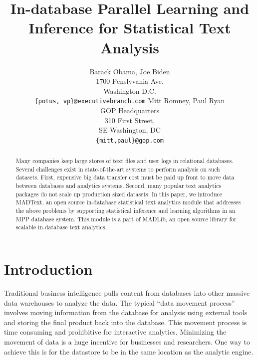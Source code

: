 \documentclass[11pt,letterpaper]{article}
\title{In-database Parallel Learning and Inference for Statistical Text Analysis}
\author{Barack Obama, Joe Biden\\
1700 Penslyvania Ave.\\
Washington D.C.\\
{\tt \{potus, vp\}@executivebranch.com}
\And
Mitt Romney, Paul Ryan\\
GOP Headquarters\\
310 First Street,\\
SE Washington, DC\\
{\tt \{mitt,paul\}@gop.com}
}
\date{}
\begin{document}
\maketitle
\begin{abstract}
Many companies keep large stores of text files and user logs in relational databases.
Several challenges exist in state-of-the-art systems to perform analysis on such datasets.
First, expensive big data transfer cost must be paid up front to move data between databases
 and analytics systems. Second, many popular text analytics packages do not scale up production sized datasets.
In this paper, we introduce MADText, an open source in-database statistical text analytics module that
 addresses the above problems by supporting statistical inference and learning algorithms in an MPP database system.
This module is a part of MADLib, an open source library for scalable in-database text analytics. 

\end{abstract}

\section{Introduction}

Traditional business intelligence pulls content from databases into other massive 
data warehouses to analyze the data. 
The typical ``data movement process'' involves moving information from the database for 
analysis using external tools and storing the final product back into the database.
This movement process is time consuming and prohibitive for interactive analytics.
Minimizing the movement of data is a huge incentive for businesses and researchers.
One way to achieve this is for the datastore to be in the same location as the analytic engine.
\end{document}
